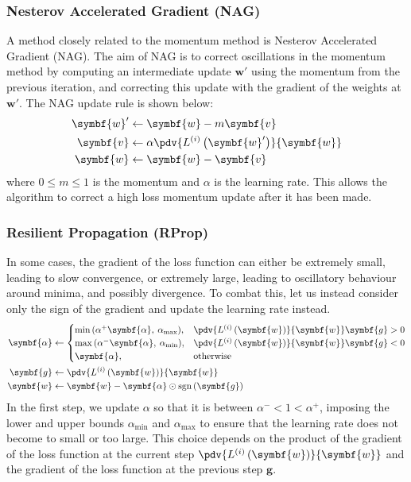 \documentclass{article}
\DeclareMathOperator{\sgn}{sgn}
\begin{document}
\subsubsection{Nesterov Accelerated Gradient (NAG)}
A method closely related to the momentum method is Nesterov Accelerated
Gradient (NAG). The aim of NAG is to correct oscillations in the
momentum method by computing an intermediate update \(\symbf{w}'\)
using the momentum from the previous iteration, and correcting this
update with the gradient of the weights at \(\symbf{w}'\). The NAG
update rule is shown below:
\begin{align*}
    \symbf{w}' & \leftarrow \symbf{w} - m \symbf{v}                                               \\
    \symbf{v}  & \leftarrow \alpha \pdv{L^{\left( i \right)}\left( \symbf{w}' \right)}{\symbf{w}} \\
    \symbf{w}  & \leftarrow \symbf{w} - \symbf{v}
\end{align*}
where \(0 \leqslant m \leqslant 1\) is the momentum and \(\alpha\) is
the learning rate. This allows the algorithm to correct a high loss
momentum update after it has been made.
\subsubsection{Resilient Propagation (RProp)}
In some cases, the gradient of the loss function can either be
extremely small, leading to slow convergence, or extremely large,
leading to oscillatory behaviour around minima, and possibly
divergence. To combat this, let us instead consider only the sign of
the gradient and update the learning rate instead.
\begin{align*}
    \symbf{\alpha} & \leftarrow
    \begin{cases}
        \min{\left( \alpha^{+} \symbf{\alpha},\: \alpha_{\mathrm{max}} \right)}, & \pdv{L^{\left( i \right)}\left( \symbf{w} \right)}{\symbf{w}} \symbf{g} > 0 \\
        \max{\left( \alpha^{-} \symbf{\alpha},\: \alpha_{\mathrm{min}} \right)}, & \pdv{L^{\left( i \right)}\left( \symbf{w} \right)}{\symbf{w}} \symbf{g} < 0 \\
        \symbf{\alpha},                                                          & \text{otherwise}
    \end{cases}
    \\
    \symbf{g}      & \leftarrow \pdv{L^{\left( i \right)}\left( \symbf{w} \right)}{\symbf{w}}   \\
    \symbf{w}      & \leftarrow \symbf{w} - \symbf{\alpha} \odot \sgn{\left( \symbf{g} \right)}
\end{align*}
In the first step, we update \(\alpha\) so that it is between
\(\alpha^{-} < 1 < \alpha^{+}\), imposing the lower
and upper bounds \(\alpha_{\mathrm{min}}\) and \(\alpha_{\mathrm{max}}\)
to ensure that the learning rate does not become to small or too large.
This choice depends on the product of the gradient of the loss function
at the current step
\(\pdv{L^{\left( i \right)}\left( \symbf{w} \right)}{\symbf{w}}\) and
the gradient of the loss function at the previous step \(\symbf{g}\).
\end{document}
